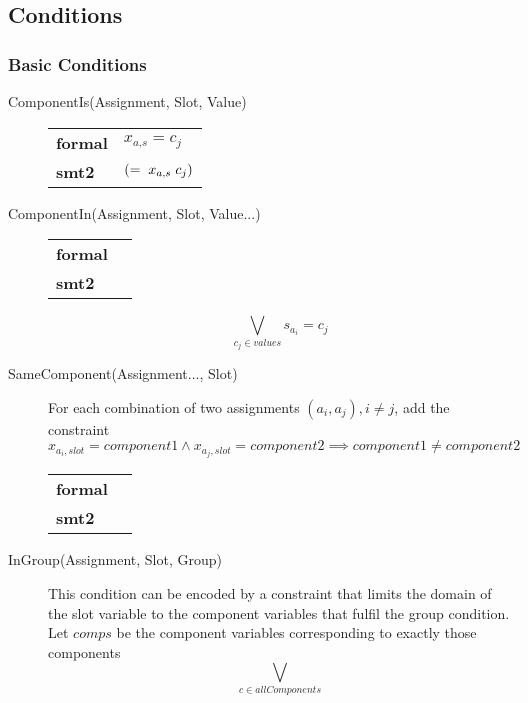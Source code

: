 \newcommand{\s}{\hspace{0.1cm}}

\subsection{Conditions}



\subsubsection{Basic Conditions}

\begin{description}
\item[ComponentIs(Assignment, Slot, Value)]

\begin{tabular}{l l}
	\textbf{formal} & $ x_{a\text{,} s} = c_j $ \\
	\textbf{smt2} & $ (= \s x_{a\text{,}s} \s c_j) $
\end{tabular}


\item[ComponentIn(Assignment, Slot, Value...)]	

\begin{tabular}{l l}
	\textbf{formal} & \\
	\textbf{smt2} & 
\end{tabular}


$$ \bigvee_{c_j\in values} s_{a_i} = c_j $$



\item[SameComponent(Assignment..., Slot)]
For each combination of two assignments $(a_i, a_j), i\neq j$, add the constraint
$$ x_{a_i, slot} = component1 \wedge x_{a_j, slot} = component2 \implies component1 \neq component2 $$

\begin{tabular}{l l}
	\textbf{formal} & \\
	\textbf{smt2} & 
\end{tabular}

		
\item[InGroup(Assignment, Slot, Group)]
This condition can be encoded by a constraint that limits the domain of the slot variable to the component variables that fulfil the group condition.
Let $comps$ be the component variables corresponding to exactly those components   
$$ \bigvee_{c\in allComponents} $$




\end{description}
